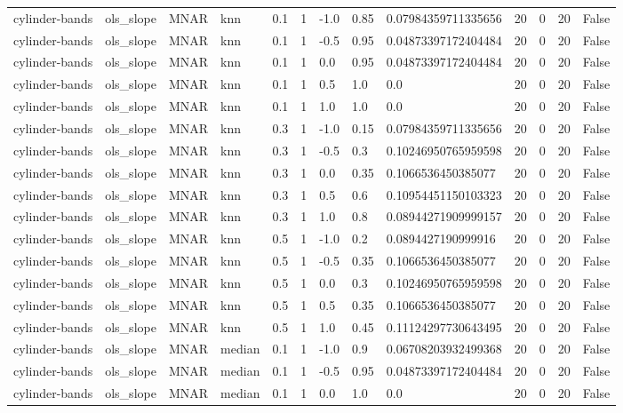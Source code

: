 \begin{tabular}{lllllllllllll}
cylinder-bands & ols\_slope & MNAR & knn & 0.1 & 1 & -1.0 & 0.85 & 0.07984359711335656 & 20 & 0 & 20 & False \\
cylinder-bands & ols\_slope & MNAR & knn & 0.1 & 1 & -0.5 & 0.95 & 0.04873397172404484 & 20 & 0 & 20 & False \\
cylinder-bands & ols\_slope & MNAR & knn & 0.1 & 1 & 0.0 & 0.95 & 0.04873397172404484 & 20 & 0 & 20 & False \\
cylinder-bands & ols\_slope & MNAR & knn & 0.1 & 1 & 0.5 & 1.0 & 0.0 & 20 & 0 & 20 & False \\
cylinder-bands & ols\_slope & MNAR & knn & 0.1 & 1 & 1.0 & 1.0 & 0.0 & 20 & 0 & 20 & False \\
cylinder-bands & ols\_slope & MNAR & knn & 0.3 & 1 & -1.0 & 0.15 & 0.07984359711335656 & 20 & 0 & 20 & False \\
cylinder-bands & ols\_slope & MNAR & knn & 0.3 & 1 & -0.5 & 0.3 & 0.10246950765959598 & 20 & 0 & 20 & False \\
cylinder-bands & ols\_slope & MNAR & knn & 0.3 & 1 & 0.0 & 0.35 & 0.1066536450385077 & 20 & 0 & 20 & False \\
cylinder-bands & ols\_slope & MNAR & knn & 0.3 & 1 & 0.5 & 0.6 & 0.10954451150103323 & 20 & 0 & 20 & False \\
cylinder-bands & ols\_slope & MNAR & knn & 0.3 & 1 & 1.0 & 0.8 & 0.08944271909999157 & 20 & 0 & 20 & False \\
cylinder-bands & ols\_slope & MNAR & knn & 0.5 & 1 & -1.0 & 0.2 & 0.0894427190999916 & 20 & 0 & 20 & False \\
cylinder-bands & ols\_slope & MNAR & knn & 0.5 & 1 & -0.5 & 0.35 & 0.1066536450385077 & 20 & 0 & 20 & False \\
cylinder-bands & ols\_slope & MNAR & knn & 0.5 & 1 & 0.0 & 0.3 & 0.10246950765959598 & 20 & 0 & 20 & False \\
cylinder-bands & ols\_slope & MNAR & knn & 0.5 & 1 & 0.5 & 0.35 & 0.1066536450385077 & 20 & 0 & 20 & False \\
cylinder-bands & ols\_slope & MNAR & knn & 0.5 & 1 & 1.0 & 0.45 & 0.11124297730643495 & 20 & 0 & 20 & False \\
cylinder-bands & ols\_slope & MNAR & median & 0.1 & 1 & -1.0 & 0.9 & 0.06708203932499368 & 20 & 0 & 20 & False \\
cylinder-bands & ols\_slope & MNAR & median & 0.1 & 1 & -0.5 & 0.95 & 0.04873397172404484 & 20 & 0 & 20 & False \\
cylinder-bands & ols\_slope & MNAR & median & 0.1 & 1 & 0.0 & 1.0 & 0.0 & 20 & 0 & 20 & False \\

\end{tabular}
